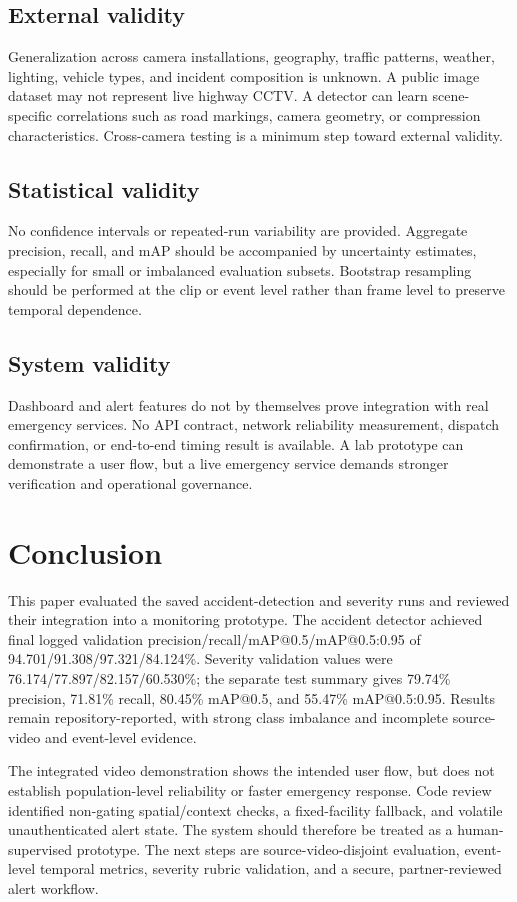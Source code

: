 \documentclass[12pt,a4paper]{article}
\begin{document}
\subsection{External validity}
Generalization across camera installations, geography, traffic patterns, weather, lighting, vehicle types, and incident composition is unknown. A public image dataset may not represent live highway CCTV. A detector can learn scene-specific correlations such as road markings, camera geometry, or compression characteristics. Cross-camera testing is a minimum step toward external validity.

\subsection{Statistical validity}
No confidence intervals or repeated-run variability are provided. Aggregate precision, recall, and mAP should be accompanied by uncertainty estimates, especially for small or imbalanced evaluation subsets. Bootstrap resampling should be performed at the clip or event level rather than frame level to preserve temporal dependence.

\subsection{System validity}
Dashboard and alert features do not by themselves prove integration with real emergency services. No API contract, network reliability measurement, dispatch confirmation, or end-to-end timing result is available. A lab prototype can demonstrate a user flow, but a live emergency service demands stronger verification and operational governance.

\section{Conclusion}
This paper evaluated the saved accident-detection and severity runs and reviewed their integration into a monitoring prototype. The accident detector achieved final logged validation precision/recall/mAP@0.5/mAP@0.5:0.95 of 94.701/91.308/97.321/84.124\%. Severity validation values were 76.174/77.897/82.157/60.530\%; the separate test summary gives 79.74\% precision, 71.81\% recall, 80.45\% mAP@0.5, and 55.47\% mAP@0.5:0.95. Results remain repository-reported, with strong class imbalance and incomplete source-video and event-level evidence.

The integrated video demonstration shows the intended user flow, but does not establish population-level reliability or faster emergency response. Code review identified non-gating spatial/context checks, a fixed-facility fallback, and volatile unauthenticated alert state. The system should therefore be treated as a human-supervised prototype. The next steps are source-video-disjoint evaluation, event-level temporal metrics, severity rubric validation, and a secure, partner-reviewed alert workflow.\appendix
\end{document}
